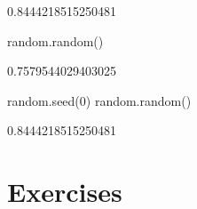\begin{raw}
0.8444218515250481
\end{raw}







\begin{pyin}
random.random()
\end{pyin}





\begin{raw}
0.7579544029403025
\end{raw}







\begin{pyin}
random.seed(0)
random.random()
\end{pyin}





\begin{raw}
0.8444218515250481
\end{raw}


\section{Exercises}

